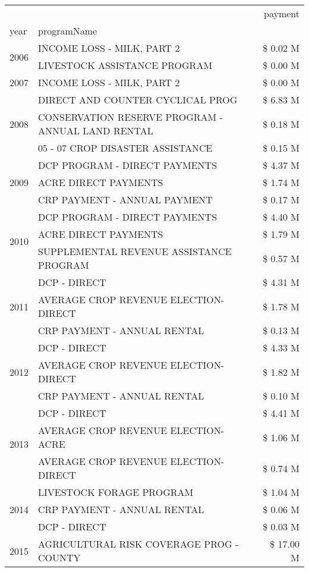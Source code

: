 \begin{tabular}{llr}
\toprule
 &  & payment \\
year & programName &  \\
\midrule
\multirow[t]{2}{*}{2006} & INCOME LOSS - MILK, PART 2 & \$ 0.02 M \\
 & LIVESTOCK ASSISTANCE PROGRAM & \$ 0.00 M \\
\cline{1-3}
2007 & INCOME LOSS - MILK, PART 2 & \$ 0.00 M \\
\cline{1-3}
\multirow[t]{3}{*}{2008} & DIRECT AND COUNTER CYCLICAL PROG & \$ 6.83 M \\
 & CONSERVATION RESERVE PROGRAM - ANNUAL LAND RENTAL & \$ 0.18 M \\
 & 05 - 07 CROP DISASTER ASSISTANCE & \$ 0.15 M \\
\cline{1-3}
\multirow[t]{3}{*}{2009} & DCP PROGRAM - DIRECT PAYMENTS & \$ 4.37 M \\
 & ACRE DIRECT PAYMENTS & \$ 1.74 M \\
 & CRP PAYMENT - ANNUAL PAYMENT & \$ 0.17 M \\
\cline{1-3}
\multirow[t]{3}{*}{2010} & DCP PROGRAM - DIRECT PAYMENTS & \$ 4.40 M \\
 & ACRE DIRECT PAYMENTS & \$ 1.79 M \\
 & SUPPLEMENTAL REVENUE ASSISTANCE PROGRAM & \$ 0.57 M \\
\cline{1-3}
\multirow[t]{3}{*}{2011} & DCP - DIRECT & \$ 4.31 M \\
 & AVERAGE CROP REVENUE ELECTION-DIRECT & \$ 1.78 M \\
 & CRP PAYMENT - ANNUAL RENTAL & \$ 0.13 M \\
\cline{1-3}
\multirow[t]{3}{*}{2012} & DCP - DIRECT & \$ 4.33 M \\
 & AVERAGE CROP REVENUE ELECTION-DIRECT & \$ 1.82 M \\
 & CRP PAYMENT - ANNUAL RENTAL & \$ 0.10 M \\
\cline{1-3}
\multirow[t]{3}{*}{2013} & DCP - DIRECT & \$ 4.41 M \\
 & AVERAGE CROP REVENUE ELECTION-ACRE & \$ 1.06 M \\
 & AVERAGE CROP REVENUE ELECTION-DIRECT & \$ 0.74 M \\
\cline{1-3}
\multirow[t]{3}{*}{2014} & LIVESTOCK FORAGE PROGRAM & \$ 1.04 M \\
 & CRP PAYMENT - ANNUAL RENTAL & \$ 0.06 M \\
 & DCP - DIRECT & \$ 0.03 M \\
\cline{1-3}
\multirow[t]{3}{*}{2015} & AGRICULTURAL RISK COVERAGE PROG - COUNTY & \$ 17.00 M \\

\end{tabular}
